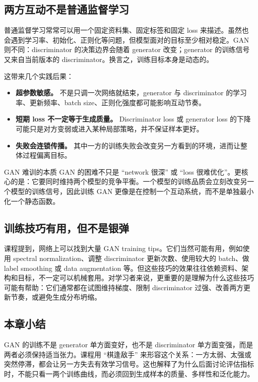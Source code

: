 \documentclass[a4paper]{article}
\begin{document}
\subsection{两方互动不是普通监督学习}

普通监督学习常常可以用一个固定资料集、固定标签和固定 loss 来描述。虽然也会遇到学习率、初始化、正则化等问题，但模型面对的目标至少相对稳定。GAN 则不同：discriminator 的决策边界会随着 generator 改变；generator 的训练信号又来自当前版本的 discriminator。换言之，训练目标本身是动态的。

这带来几个实践后果：

\begin{itemize}
    \item \textbf{超参数敏感。} 不是只调一次网络就结束，generator 与 discriminator 的学习率、更新频率、batch size、正则化强度都可能影响互动节奏。
    \item \textbf{短期 loss 不一定等于生成质量。} Discriminator loss 或 generator loss 的下降可能只是对方变弱或进入某种局部策略，并不保证样本更好。
    \item \textbf{失败会连锁传播。} 其中一方的训练失败会改变另一方看到的环境，进而让整体过程偏离目标。
\end{itemize}

\begin{importantbox}{GAN 难训的本质}
    GAN 的困难不只是 ``network 很深'' 或 ``loss 很难优化''。更核心的是：它要同时维持两个模型的竞争平衡。一个模型的训练品质会立刻改变另一个模型的训练信号，因此训练 GAN 更像是在控制一个互动系统，而不是单独最小化一个静态函数。
\end{importantbox}

\subsection{训练技巧有用，但不是银弹}

课程提到，网络上可以找到大量 GAN training tips。它们当然可能有用，例如使用 spectral normalization、调整 discriminator 更新次数、使用较大的 batch、做 label smoothing 或 data augmentation 等。但这些技巧的效果往往依赖资料、架构和目标，不一定可以机械套用。对学习者来说，更重要的是理解为什么这些技巧可能有帮助：它们通常都在试图维持梯度、限制 discriminator 过强、改善两方更新节奏，或避免生成分布坍缩。

\subsection{本章小结}

GAN 的训练不是 generator 单方面变好，也不是 discriminator 单方面变强，而是两者必须保持适当张力。课程用 ``棋逢敌手'' 来形容这个关系：一方太弱、太强或突然停滞，都会让另一方失去有效学习信号。这也解释了为什么后面讨论评估指标时，不能只看一两个训练曲线，而必须回到生成样本的质量、多样性和泛化能力。
\end{document}
